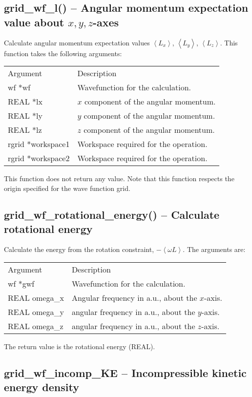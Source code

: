 \documentclass[12pt,letterpaper]{report}
\begin{document}
\subsection{grid\_wf\_l() -- Angular momentum expectation value about $x,y,z$-axes}

Calculate angular momentum expectation values $\left<L_x\right>$, $\left<L_y\right>$, $\left<L_z\right>$. This function takes the following arguments:
\begin{longtable}{p{} p{}}
Argument & Description\\
\cline{1-2}
wf *wf & Wavefunction for the calculation.\\
REAL *lx & $x$ component of the angular momentum.\\
REAL *ly & $y$ component of the angular momentum.\\
REAL *lz & $z$ component of the angular momentum.\\
rgrid *workspace1 & Workspace required for the operation.\\
rgrid *workspace2 & Workspace required for the operation.\\
\end{longtable}
\noindent
This function does not return any value. Note that this function respects the origin specified for the wave function grid.

\subsection{grid\_wf\_rotational\_energy() -- Calculate rotational energy}

Calculate the energy from the rotation constraint, $-\left<\omega L\right>$. The arguments are:
\begin{longtable}{p{} p{}}
Argument & Description\\
\cline{1-2}
wf *gwf & Wavefunction for the calculation.\\
REAL omega\_x & Angular frequency in a.u., about the $x$-axis.\\
REAL omega\_y & angular frequency in a.u., about the $y$-axis.\\
REAL omega\_z & angular frequency in a.u., about the $z$-axis.\\
\end{longtable}
\noindent
The return value is the rotational energy (REAL).

\subsection{grid\_wf\_incomp\_KE -- Incompressible kinetic energy density}
\end{document}
